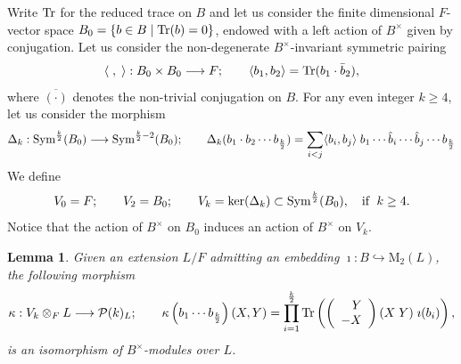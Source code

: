 \documentclass{amsart}
\newtheorem{lemma}[theorem]{Lemma}
\theoremstyle{definition}
\theoremstyle{remark}
\numberwithin{equation}{section}
\newcommand{\M}{\mathrm{M}}
\newcommand{\cP}{{\mathcal P}}
\begin{document}
Write ${\rm Tr}$ for the reduced trace on $B$ and let us consider the finite dimensional $F$-vector space
$B_0=\{b\in B\mid {\rm Tr}(b)=0\}$,
endowed with a left action of $B^\times$ given by conjugation. Let us consider the non-degenerate $B^\times$-invariant symmetric pairing
\[
\langle\;,\;\rangle:B_0\times B_0\longrightarrow F;\qquad \langle b_1,b_2\rangle={\rm Tr}(b_1\cdot \bar b_2),
\]
where $\overline{(\cdot)}$ denotes the non-trivial conjugation on $B$. For any even integer $k\geq 4$, let us consider the morphism
\[
\Delta_k:{\rm Sym}^{\frac{k}{2}}(B_0)\longrightarrow{\rm Sym}^{\frac{k}{2}-2}(B_0);\qquad \Delta_k(b_1\cdot b_2\cdots b_{\frac{k}{2}})=\sum_{i<j}\langle b_i,b_j\rangle\; b_1\cdots \hat b_i\cdots\hat b_j\cdots b_{\frac{k}{2}}
\]
We define
\[
V_0=F;\qquad V_2=B_0;\qquad V_k=\ker(\Delta_k)\subset {\rm Sym}^{\frac{k}{2}}(B_0),\quad \mbox{if }\;k\geq 4.
\]
Notice that the action of $B^\times$ on $B_0$ induces an action of $B^\times$ on $V_k$.
\begin{lemma}\label{lemaVkVk}
Given an extension $L/F$ admitting an embedding $\imath:B\hookrightarrow \M_2(L)$, the following morphism
    \[
    \kappa:V_k\otimes_F L\longrightarrow \cP(k)_L;\qquad \kappa\left(b_1\cdots b_{\frac{k}{2}}\right)(X,Y)=\prod_{i=1}^{\frac{k}{2}}{\rm Tr}\left(\left(\begin{array}{r}  Y\\-X\end{array}\right)(X\; Y)\;\imath(b_i)\right),
    \]
    is an isomorphism of $B^\times$-modules over $L$.
\end{lemma}
\end{document}
